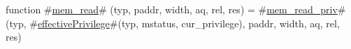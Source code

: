 function #\hyperref[sailRISCVzmemzyread]{mem\_read}# (typ, paddr, width, aq, rel, res) =
  #\hyperref[sailRISCVzmemzyreadzypriv]{mem\_read\_priv}#(typ, #\hyperref[sailRISCVzeffectivePrivilege]{effectivePrivilege}#(typ, mstatus, cur_privilege), paddr, width, aq, rel, res)
